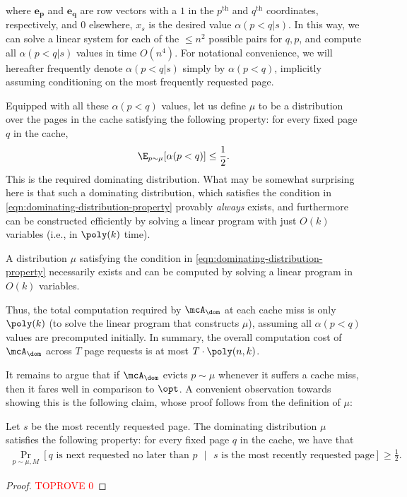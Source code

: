 \documentclass[11pt]{article}
\begin{document}
where $\boldsymbol{e_p}$ and $\boldsymbol{e_q}$ are row vectors with a $1$ in the $p^{\text{th}}$ and $q^{\text{th}}$ coordinates, respectively, and $0$ elsewhere, $x_s$ is the desired value $\alpha(p<q|s)$. In this way, we can solve a linear system for each of the $\le n^2$ possible pairs for $q,p$, and compute all $\alpha(p<q|s)$ values in time $O(n^4)$. For notational convenience, we will hereafter frequently denote $\alpha(p<q|s)$ simply by $\alpha(p<q)$, implicitly assuming conditioning on the most frequently requested page.


Equipped with all these $\alpha(p<q)$ values, let us define $\mu$ to be a distribution over the pages in the cache satisfying the following property: for every fixed page $q$ in the cache,
\begin{align}
    \label{eqn:dominating-distribution-property}
    \E_{p \sim \mu}[\alpha(p<q)] \le \frac{1}{2}.
\end{align}
This is the required dominating distribution. What may be somewhat surprising here is that such a dominating distribution, which satisfies the condition in \eqref{eqn:dominating-distribution-property} provably \textit{always} exists, and furthermore can be constructed efficiently by solving a linear program with just $O(k)$ variables (i.e., in $\poly(k)$ time).
\begin{theorem}
    \label{thm:dominating-distribution-exists}
    A distribution $\mu$ satisfying the condition in \eqref{eqn:dominating-distribution-property} necessarily exists and can be computed by solving a linear program in $O(k)$ variables.
\end{theorem}
Thus, the total computation required by $\mcA_\dom$ at each cache miss is only $\poly(k)$ (to solve the linear program that constructs $\mu$), assuming all $\alpha(p<q)$ values are precomputed initially. In summary, the overall computation cost of $\mcA_\dom$ across $T$ page requests is at most $T \cdot \poly(n, k)$.

It remains to argue that if $\mcA_\dom$ evicts $p \sim \mu$ whenever it suffers a cache miss, then it fares well in comparison to $\opt$. A convenient observation towards showing this is the following claim, whose proof follows from the definition of $\mu$:
\begin{claim}
    \label{claim:dominating-distribution-probability}
    Let $s$ be the most recently requested page. The dominating distribution $\mu$ satisfies the following property: for every fixed page $q$ in the cache, we have that
    \begin{align}
        \Pr_{p \sim \mu, M}[\text{$q$ is next requested no later than $p$ }|\text{ $s$ is the most recently requested page}] \ge \frac{1}{2}.
    \end{align}
\end{claim}
\begin{proof}\textcolor{red}{TOPROVE 0}\end{proof}
\end{document}
